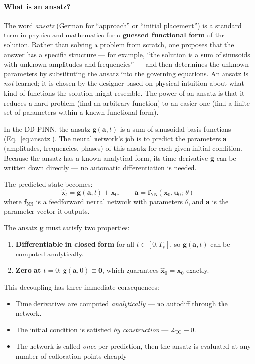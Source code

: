\documentclass[11pt]{article}
\newcommand{\xhat}{\hat{\bm{x}}}
\newcommand{\avec}{\bm{a}}
\newcommand{\uvec}{\bm{u}}
\newcommand{\xvec}{\bm{x}}
\newcommand{\fnn}{\bm{f}_{\mathrm{NN}}}
\begin{document}
\paragraph{What is an ansatz?} The word \emph{ansatz} (German for ``approach'' or ``initial placement'') is a standard term in physics and mathematics for a \textbf{guessed functional form} of the solution. Rather than solving a problem from scratch, one proposes that the answer has a specific structure --- for example, ``the solution is a sum of sinusoids with unknown amplitudes and frequencies'' --- and then determines the unknown parameters by substituting the ansatz into the governing equations. An ansatz is \emph{not} learned; it is chosen by the designer based on physical intuition about what kind of functions the solution might resemble. The power of an ansatz is that it reduces a hard problem (find an arbitrary function) to an easier one (find a finite set of parameters within a known functional form).

In the DD-PINN, the ansatz $\bm{g}(\avec, t)$ is a sum of sinusoidal basis functions (Eq.~\ref{eq:ansatz}). The neural network's job is to predict the parameters $\avec$ (amplitudes, frequencies, phases) of this ansatz for each given initial condition. Because the ansatz has a known analytical form, its time derivative $\dot{\bm{g}}$ can be written down directly --- no automatic differentiation is needed.

\medskip
\noindent The predicted state becomes:
\begin{equation}
    \boxed{\xhat_t = \bm{g}(\avec, t) + \xvec_0, \qquad \avec = \fnn(\xvec_0, \uvec_0;\, \theta)}
    \label{eq:ddpinn-core}
\end{equation}
where $\fnn$ is a feedforward neural network with parameters $\theta$, and $\avec$ is the parameter vector it outputs.

The ansatz $\bm{g}$ must satisfy two properties:
\begin{enumerate}
    \item \textbf{Differentiable in closed form} for all $t \in [0, T_s]$, so $\dot{\bm{g}}(\avec, t)$ can be computed analytically.
    \item \textbf{Zero at $t = 0$}: $\bm{g}(\avec, 0) \equiv \bm{0}$, which guarantees $\xhat_0 = \xvec_0$ exactly.
\end{enumerate}

This decoupling has three immediate consequences:
\begin{itemize}
    \item Time derivatives are computed \emph{analytically} --- no autodiff through the network.
    \item The initial condition is satisfied \emph{by construction} --- $\mathcal{L}_{\mathrm{IC}} \equiv 0$.
    \item The network is called \emph{once} per prediction, then the ansatz is evaluated at any number of collocation points cheaply.
\end{itemize}
\end{document}
